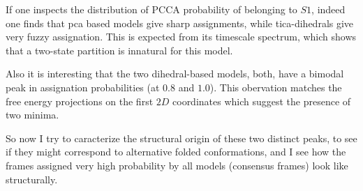 \documentclass[prl,twocolumn]{revtex4-1}
\begin{document}
If one inspects the distribution of PCCA probability of belonging to $S1$, indeed one finds that pca based models give sharp assignments, while tica-dihedrals give very  fuzzy assignation. This is expected from its timescale spectrum, which shows that a two-state partition is innatural for this model. 

Also it is interesting that the two dihedral-based models, both, have a bimodal peak in assignation probabilities (at $0.8$ and $1.0$). This obervation matches the free energy projections on the first $2D$ coordinates which suggest the presence of two minima. 

So now I try to caracterize the structural origin of these two distinct peaks, to see if they might correspond to alternative folded conformations, and I see how the frames assigned very high probability by all models (consensus frames) look like structurally.
\end{document}
